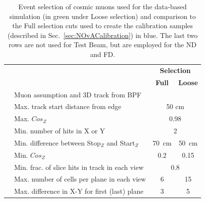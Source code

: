 \begin{table}[!ht]
\centering
\caption[Overview of the event selection for the data-based simulation]{Event selection of cosmic muons used for the data-based simulation (in green under Loose selection) and comparison to the Full selection cuts used to create the calibration samples (described in Sec.~\ref{sec:NOvACalibration}) in blue. The last two rows are not used for Test Beam, but are employed for the \acrshort{ND} and \acrshort{FD}.}
\begin{tabular}{clcc}
& \multirow{2}{*}{\centering{\textbf{Cut}}} & \multicolumn{2}{c}{\textbf{Selection}}\\
& & \cellcolor[HTML]{3166FF}\textbf{Full} & \cellcolor[HTML]{32CB00}\textbf{Loose}\\\hline
                                   & Muon assumption and 3D track from BPF         &                                             &                                          \\
                                   & Max. track start distance from edge                       & \multicolumn{2}{c}{50 cm}                                                                 \\
                                   & Max. $Cos_{Z}$                                            & \multicolumn{2}{c}{0.98}                                                               \\ \hline
                                   & Min. number of hits in X or Y                             & \multicolumn{2}{c}{\cellcolor[HTML]{FFFFFF}2}                                          \\
                                   & Min. difference between Stop$_{Z}$ and Start$_{Z}$        & \cellcolor[HTML]{3166FF}70~cm                 & \cellcolor[HTML]{32CB00}50~cm             \\
                                   & Min. $Cos_{Z}$ & \cellcolor[HTML]{3166FF}0.2                 & \cellcolor[HTML]{32CB00}0.15             \\
                                   & Min. frac. of slice hits in track in each view    & \multicolumn{2}{c}{0.8}                                                                \\
                                   & Max. number of cells per plane in each view               & \cellcolor[HTML]{3166FF}6                   & \cellcolor[HTML]{32CB00}15               \\
                                   & Max. difference in X-Y for first (last) plane     & \cellcolor[HTML]{3166FF}3                   & \cellcolor[HTML]{32CB00}5                \\

\end{tabular}
\end{table}
